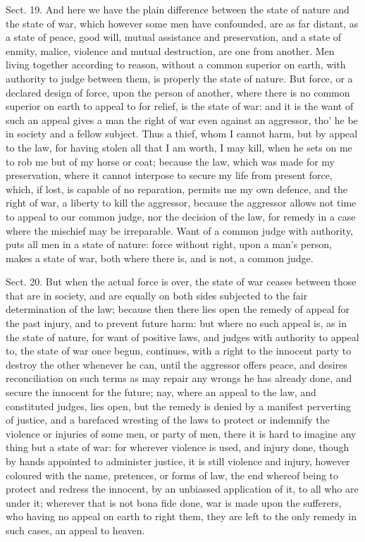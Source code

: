 \documentclass[11pt,openany]{book}
\begin{document}
Sect. 19. And here we have the plain difference between the state of nature and the state of war, which however some men have confounded, are as far distant, as a state of peace, good will, mutual assistance and preservation, and a state of enmity, malice, violence and mutual destruction, are one from another. Men living together according to reason, without a common superior on earth, with authority to judge between them, is properly the state of nature. But force, or a declared design of force, upon the person of another, where there is no common superior on earth to appeal to for relief, is the state of war: and it is the want of such an appeal gives a man the right of war even against an aggressor, tho' he be in society and a fellow subject. Thus a thief, whom I cannot harm, but by appeal to the law, for having stolen all that I am worth, I may kill, when he sets on me to rob me but of my horse or coat; because the law, which was made for my preservation, where it cannot interpose to secure my life from present force, which, if lost, is capable of no reparation, permits me my own defence, and the right of war, a liberty to kill the aggressor, because the aggressor allows not time to appeal to our common judge, nor the decision of the law, for remedy in a case where the mischief may be irreparable. Want of a common judge with authority, puts all men in a state of nature: force without right, upon a man's person, makes a state of war, both where there is, and is not, a common judge.

Sect. 20. But when the actual force is over, the state of war ceases between those that are in society, and are equally on both sides subjected to the fair determination of the law; because then there lies open the remedy of appeal for the past injury, and to prevent future harm: but where no such appeal is, as in the state of nature, for want of positive laws, and judges with authority to appeal to, the state of war once begun, continues, with a right to the innocent party to destroy the other whenever he can, until the aggressor offers peace, and desires reconciliation on such terms as may repair any wrongs he has already done, and secure the innocent for the future; nay, where an appeal to the law, and constituted judges, lies open, but the remedy is denied by a manifest perverting of justice, and a barefaced wresting of the laws to protect or indemnify the violence or injuries of some men, or party of men, there it is hard to imagine any thing but a state of war: for wherever violence is used, and injury done, though by hands appointed to administer justice, it is still violence and injury, however coloured with the name, pretences, or forms of law, the end whereof being to protect and redress the innocent, by an unbiassed application of it, to all who are under it; wherever that is not bona fide done, war is made upon the sufferers, who having no appeal on earth to right them, they are left to the only remedy in such cases, an appeal to heaven.
\end{document}
